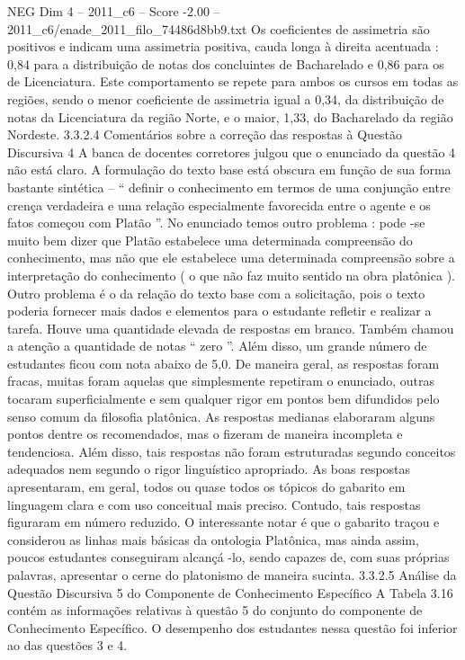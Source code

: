 \begin{textsample}{NEG Dim 4 – 2011\_c6 – Score -2.00 – 2011\_c6/enade\_2011\_filo\_74486d8bb9.txt}
Os coeficientes de assimetria são positivos e indicam uma assimetria positiva, cauda longa à direita acentuada : 0,84 para a distribuição de notas dos concluintes de Bacharelado e 0,86 para os de Licenciatura.
Este comportamento se repete para ambos os cursos em todas as regiões, sendo o menor coeficiente de assimetria igual a 0,34, da distribuição de notas da Licenciatura da região Norte, e o maior, 1,33, do Bacharelado da região Nordeste. 3.3.2.4 Comentários sobre a correção das respostas à Questão Discursiva 4 A banca de docentes corretores julgou que o enunciado da questão 4 não está claro.
A formulação do texto base está obscura em função de sua forma bastante sintética – “ definir o conhecimento em termos de uma conjunção entre crença verdadeira e uma relação especialmente favorecida entre o agente e os fatos começou com Platão ”.
No enunciado temos outro problema : pode -se muito bem dizer que Platão estabelece uma determinada compreensão do conhecimento, mas não que ele estabelece uma determinada compreensão sobre a interpretação do conhecimento ( o que não faz muito sentido na obra platônica ).
Outro problema é o da relação do texto base com a solicitação, pois o texto poderia fornecer mais dados e elementos para o estudante refletir e realizar a tarefa.
Houve uma quantidade elevada de respostas em branco.
Também chamou a atenção a quantidade de notas “ zero ”.
Além disso, um grande número de estudantes ficou com nota abaixo de 5,0.
De maneira geral, as respostas foram fracas, muitas foram aquelas que simplesmente repetiram o enunciado, outras tocaram superficialmente e sem qualquer rigor em pontos bem difundidos pelo senso comum da filosofia platônica.
As respostas medianas elaboraram alguns pontos dentre os recomendados, mas o fizeram de maneira incompleta e tendenciosa.
Além disso, tais respostas não foram estruturadas segundo conceitos adequados nem segundo o rigor linguístico apropriado.
As boas respostas apresentaram, em geral, todos ou quase todos os tópicos do gabarito em linguagem clara e com uso conceitual mais preciso.
Contudo, tais respostas figuraram em número reduzido.
O interessante notar é que o gabarito traçou e considerou as linhas mais básicas da ontologia Platônica, mas ainda assim, poucos estudantes conseguiram alcançá -lo, sendo capazes de, com suas próprias palavras, apresentar o cerne do platonismo de maneira sucinta. 3.3.2.5 Análise da Questão Discursiva 5 do Componente de Conhecimento Específico A Tabela 3.16 contém as informações relativas à questão 5 do conjunto do componente de Conhecimento Específico.
O desempenho dos estudantes nessa questão foi inferior ao das questões 3 e 4.

\end{textsample}
